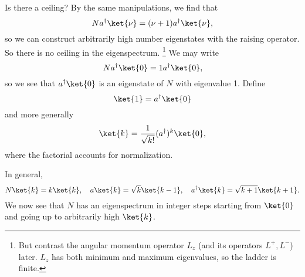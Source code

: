 Is there a ceiling? By the same manipulations, we find that
\begin{equation}
    Na^\dagger \ket{\nu} = (\nu+1) a^\dagger \ket{\nu},
\end{equation}
so we can construct arbitrarily high number eigenstates with the raising operator. So there is no ceiling in the eigenspectrum.%
    \footnote{But contrast the angular momentum operator $L_z$ (and its operators $L^+,L^-$) later. $L_z$ has both minimum and maximum eigenvalues, so the ladder is finite.}
We may write
\begin{equation}
    N a^\dagger \ket{0} = 1 a^\dagger \ket{0},
\end{equation}
so we see that $a^\dagger\ket{0}$ is an eigenstate of $N$ with eigenvalue 1. Define
\begin{equation}
    \ket{1} = a^\dagger \ket{0}
\end{equation}
and more generally
\begin{equation}
    \ket{k}=\frac{1}{\sqrt{k!}}(a^\dagger)^k \ket{0},
\end{equation}
where the factorial accounts for normalization.

In general,
\begin{equation}
    N\ket{k} = k\ket{k}, \quad a\ket{k} = \sqrt{k} \ket{k-1},\quad a^\dagger \ket{k} = \sqrt{k+1} \ket{k+1}.
\end{equation}
We now see that $N$ has an eigenspectrum in integer steps starting from $\ket{0}$ and going up to arbitrarily high $\ket{k}$.

